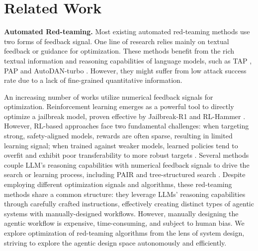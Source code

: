 \vspace{-0.2cm}
\section{Related Work}

\textbf{Automated Red-teaming.} Most existing automated red-teaming methods use two forms of feedback signal. One line of research relies mainly on textual feedback or guidance for optimization. These methods benefit from the rich textual information and reasoning capabilities of language models, such as TAP \citep{mehrotra2024tree}, PAP \citep{zeng2024johnny} and AutoDAN-turbo \citep{liu2025autodanturbolifelongagentstrategy}. However, they might suffer from low attack success rate due to a lack of fine-grained quantitative information.

An increasing number of works utilize numerical feedback signals for optimization. Reinforcement learning emerges as a powerful tool to directly optimize a jailbreak model, proven effective by Jailbreak-R1 \citep{guo2025jailbreak} and RL-Hammer \citep{wen2025rl}. However, RL-based approaches face two fundamental challenges: when targeting strong, safety-aligned models, rewards are often sparse, resulting in limited learning signal; when trained against weaker models, learned policies tend to overfit and exhibit poor transferability to more robust targets \citep{liu2025superrlreinforcementlearningsupervision, wen2025rl}. Several methods couple LLM's reasoning capabilities with numerical feedback signals to drive the search or learning process, including PAIR \cite{chao2025jailbreaking} and tree-structured search \citep{sabbaghi2025adversarial}. %
Despite employing different optimization signals and algorithms, these red-teaming methods share a common structure: they leverage LLMs' reasoning capabilities through carefully crafted instructions, effectively creating distinct types of agentic systems with manually-designed workflows. However, manually designing the agentic workflow is expensive, time-consuming, and subject to human bias. We explore optimization of red-teaming algorithms from the lens of system design, striving to explore the agentic design space autonomously and efficiently.

